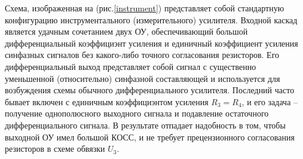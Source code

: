 \documentclass[a4paper,12pt]{article}
\begin{document}
Схема, изображенная на (рис.\ref{instrument}) представляет собой стандартную конфигурацию инструментального (измерительного) усилителя.
Входной каскад является удачным сочетанием двух ОУ, обеспечивающий большой дифференциальный коэффициэнт усиления и
единичный коэффициент усиления синфазных сигналов без какого-либо точного согласования резисторов.
Его дифференциальный выход представляет собой сигнал с существенно уменьшенной (относительно) синфазной составляющей 
и используется для возбуждения схемы обычного дифференциального усилителя. Последний часто бывает включен
с единичным коэффициэнтом усиления $R_3 = R_4$, и его задача -- получение однополюсного выходного сигнала
и подавление остаточного дифференциального сигнала. В результате отпадает надобность в том, 
чтобы выходной ОУ имел большой КОСС, и не требует прецензионного согласования резисторов в схеме обвязки $U_3$.
\end{document}
